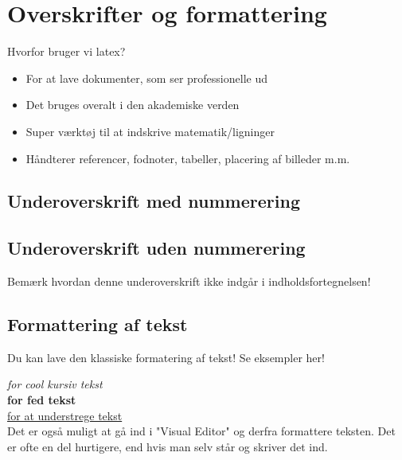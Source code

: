 \section{Overskrifter og formattering}
Hvorfor bruger vi latex? 
\begin{itemize}
    \item For at lave dokumenter, som ser professionelle ud
    \item Det bruges overalt i den akademiske verden
    \item Super værktøj til at indskrive matematik/ligninger
    \item Håndterer referencer, fodnoter, tabeller, placering af billeder m.m.
\end{itemize}

\subsection{Underoverskrift med nummerering}

\subsection*{Underoverskrift uden nummerering}
Bemærk hvordan denne underoverskrift ikke indgår i indholdsfortegnelsen!

\subsection{Formattering af tekst}
Du kan lave den klassiske formatering af tekst! Se eksempler her!

\textit{for cool kursiv tekst} \\
\textbf{for fed tekst}  \\
\underline{for at understrege tekst} \\

Det er også muligt at gå ind i "Visual Editor" og derfra formattere teksten. Det er ofte en del hurtigere, end hvis man selv står og skriver det ind.

